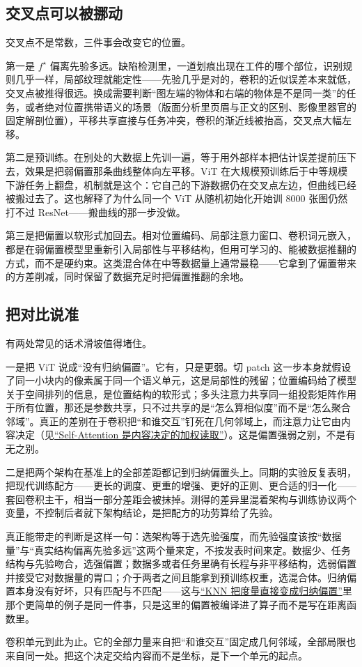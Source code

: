 \subsection{交叉点可以被挪动}

交叉点不是常数，三件事会改变它的位置。

第一是 \(f^\star\) 偏离先验多远。缺陷检测里，一道划痕出现在工件的哪个部位，识别规则几乎一样，局部纹理就能定性——先验几乎是对的，卷积的近似误差本来就低，交叉点被推得很远。换成需要判断``图左端的物体和右端的物体是不是同一类''的任务，或者绝对位置携带语义的场景（版面分析里页眉与正文的区别、影像里器官的固定解剖位置），平移共享直接与任务冲突，卷积的渐近线被抬高，交叉点大幅左移。

第二是预训练。在别处的大数据上先训一遍，等于用外部样本把估计误差提前压下去，效果是把弱偏置那条曲线整体向左平移。ViT 在大规模预训练后于中等规模下游任务上翻盘，机制就是这个：它自己的下游数据仍在交叉点左边，但曲线已经被搬过去了。这也解释了为什么同一个 ViT 从随机初始化开始训 8000 张图仍然打不过 ResNet——搬曲线的那一步没做。

第三是把偏置以软形式加回去。相对位置编码、局部注意力窗口、卷积词元嵌入，都是在弱偏置模型里重新引入局部性与平移结构，但用可学习的、能被数据推翻的方式，而不是硬约束。这类混合体在中等数据量上通常最稳——它拿到了偏置带来的方差削减，同时保留了数据充足时把偏置推翻的余地。

\subsection{把对比说准}

有两处常见的话术滑坡值得堵住。

一是把 ViT 说成``没有归纳偏置''。它有，只是更弱。切 patch 这一步本身就假设了同一小块内的像素属于同一个语义单元，这是局部性的残留；位置编码给了模型关于空间排列的信息，是位置结构的软形式；多头注意力共享同一组投影矩阵作用于所有位置，那还是参数共享，只不过共享的是``怎么算相似度''而不是``怎么聚合邻域''。真正的差别在于卷积把``和谁交互''钉死在几何邻域上，而注意力让它由内容决定（见\hyperref[sec:14-Deep-Learning/05-Attention-and-Sequence-Models/01]{``Self-Attention 是内容决定的加权读取''}）。这是偏置强弱之别，不是有无之别。

二是把两个架构在基准上的全部差距都记到归纳偏置头上。同期的实验反复表明，把现代训练配方——更长的调度、更重的增强、更好的正则、更合适的归一化——套回卷积主干，相当一部分差距会被抹掉。测得的差异里混着架构与训练协议两个变量，不控制后者就下架构结论，是把配方的功劳算给了先验。

真正能带走的判断是这样一句：选架构等于选先验强度，而先验强度该按``数据量''与``真实结构偏离先验多远''这两个量来定，不按发表时间来定。数据少、任务结构与先验吻合，选强偏置；数据多或者任务里确有长程与非平移结构，选弱偏置并接受它对数据量的胃口；介于两者之间且能拿到预训练权重，选混合体。归纳偏置本身没有好坏，只有匹配与不匹配——这与\hyperref[sec:13-Machine-Learning/03-Trees-Ensembles-and-Neighbors/03]{``KNN 把度量直接变成归纳偏置''}里那个更简单的例子是同一件事，只是这里的偏置被编译进了算子而不是写在距离函数里。

卷积单元到此为止。它的全部力量来自把``和谁交互''固定成几何邻域，全部局限也来自同一处。把这个决定交给内容而不是坐标，是下一个单元的起点。
